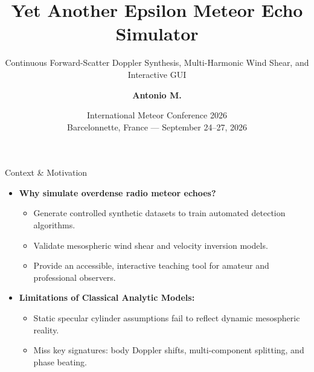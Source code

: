 \documentclass[aspectratio=169, 10pt]{beamer}
\title{Yet Another Epsilon Meteor Echo Simulator}
\subtitle{Continuous Forward-Scatter Doppler Synthesis, Multi-Harmonic Wind Shear, and Interactive GUI}
\author{\textbf{Antonio M.}}
\institute{International Meteor Organization (IMO) / Radio Observation Group}
\date{International Meteor Conference 2026\\Barcelonnette, France --- September 24--27, 2026}
\begin{document}
\begin{frame}[plain]
    \titlepage
\end{frame}

\begin{frame}{Context \& Motivation}
    \begin{itemize}
        \item \textbf{Why simulate overdense radio meteor echoes?}
        \begin{itemize}
            \item Generate controlled synthetic datasets to train automated detection algorithms.
            \item Validate mesospheric wind shear and velocity inversion models.
            \item Provide an accessible, interactive teaching tool for amateur and professional observers.
        \end{itemize}
        \vspace{0.3cm}
        \item \textbf{Limitations of Classical Analytic Models:}
        \begin{itemize}
            \item Static specular cylinder assumptions fail to reflect dynamic mesospheric reality.
            \item Miss key signatures: body Doppler shifts, multi-component splitting, and phase beating.
        \end{itemize}
    \end{itemize}
\end{frame}
\end{document}
